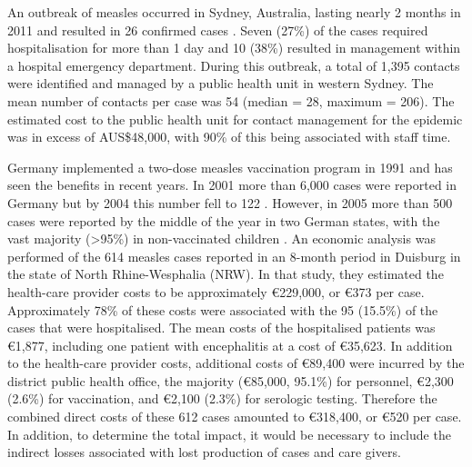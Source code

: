 \documentclass{article}
\begin{document}
An outbreak of measles occurred in Sydney, Australia, lasting nearly 2 months in 2011 and resulted in 26 confirmed cases \citep{flego13}. Seven (27\%) of the cases required hospitalisation for more than 1 day and 10 (38\%) resulted in management within a hospital emergency department. During this outbreak, a total of 1,395 contacts were identified and managed by a public health unit in western Sydney. The mean number of contacts per case was 54 (median = 28, maximum = 206). The estimated cost to the public health unit for contact management for the epidemic was in excess of AUS\$48,000, with 90\% of this being associated with staff time. 

Germany implemented a two-dose measles vaccination program in 1991 and has seen the benefits in recent years. In 2001 more than 6,000 cases were reported in Germany but by 2004 this number fell to 122 \citep{wichmann9}. However, in 2005 more than 500 cases were reported by the middle of the year in two German states, with the vast majority (>95\%) in non-vaccinated children \citep{siedler6}. An economic analysis was performed of the 614 measles cases reported in an 8-month period in Duisburg in the state of North Rhine-Wesphalia (NRW). In that study, they estimated the health-care provider costs to be approximately \euro 229,000, or \euro 373 per case. Approximately 78\% of these costs were associated with the 95 (15.5\%) of the cases that were hospitalised. The mean costs of the hospitalised patients was  \euro 1,877, including one patient with encephalitis at a cost of \euro 35,623. In addition to the health-care provider costs, additional costs of \euro 89,400 were incurred by the district public health office, the majority (\euro 85,000, 95.1\%) for personnel, \euro 2,300 (2.6\%) for vaccination, and \euro 2,100 (2.3\%) for serologic testing. Therefore the combined direct costs of these 612 cases amounted to \euro 318,400, or \euro 520 per case. In addition, to determine the total impact, it would be necessary to include the indirect losses associated with lost production of cases and care givers.
\end{document}
